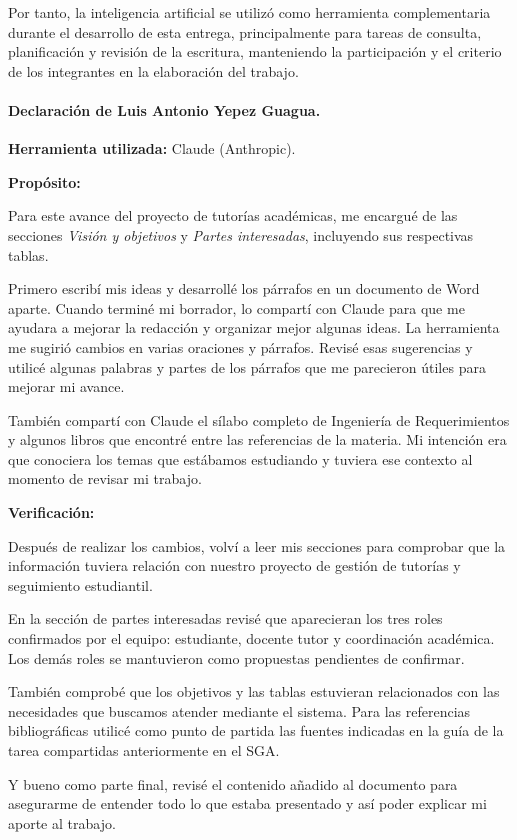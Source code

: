 \documentclass[11pt,a4paper]{article}
\begin{document}
Por tanto, la inteligencia artificial se utilizó como herramienta complementaria durante el desarrollo de esta entrega, principalmente para tareas de consulta, planificación y revisión de la escritura, manteniendo la participación y el criterio de los integrantes en la elaboración del trabajo.


\paragraph{Declaración de Luis Antonio Yepez Guagua.}

\textbf{Herramienta utilizada:} Claude (Anthropic).

\textbf{Propósito:}

Para este avance del proyecto de tutorías académicas, me encargué de las secciones \textit{Visión y objetivos} y \textit{Partes interesadas}, incluyendo sus respectivas tablas.

Primero escribí mis ideas y desarrollé los párrafos en un documento de Word aparte. Cuando terminé mi borrador, lo compartí con Claude para que me ayudara a mejorar la redacción y organizar mejor algunas ideas. La herramienta me sugirió cambios en varias oraciones y párrafos. Revisé esas sugerencias y utilicé algunas palabras y partes de los párrafos que me parecieron útiles para mejorar mi avance.

También compartí con Claude el sílabo completo de Ingeniería de Requerimientos y algunos libros que encontré entre las referencias de la materia. Mi intención era que conociera los temas que estábamos estudiando y tuviera ese contexto al momento de revisar mi trabajo.


\textbf{Verificación:}

Después de realizar los cambios, volví a leer mis secciones para comprobar que la información tuviera relación con nuestro proyecto de gestión de tutorías y seguimiento estudiantil.

En la sección de partes interesadas revisé que aparecieran los tres roles confirmados por el equipo: estudiante, docente tutor y coordinación académica. Los demás roles se mantuvieron como propuestas pendientes de confirmar.

También comprobé que los objetivos y las tablas estuvieran relacionados con las necesidades que buscamos atender mediante el sistema. Para las referencias bibliográficas utilicé como punto de partida las fuentes indicadas en la guía de la tarea compartidas anteriormente en el SGA.

Y bueno como parte final, revisé el contenido añadido al documento para asegurarme de entender todo lo que estaba presentado y así poder explicar mi aporte al trabajo.
\end{document}
